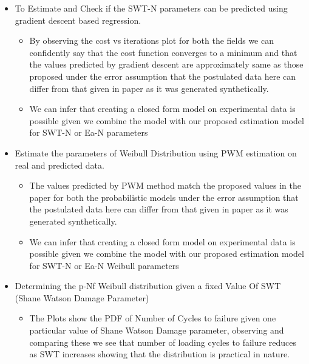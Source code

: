 \documentclass[11pt]{article}
\providecommand{\tightlist}{%
      \setlength{\itemsep}{0pt}\setlength{\parskip}{0pt}}
\begin{document}
\begin{itemize}
\item
  To Estimate and Check if the SWT-N parameters can be predicted using
  gradient descent based regression.

  \begin{itemize}
  \tightlist
  \item
    By observing the cost vs iterations plot for both the fields we can
    confidently say that the cost function converges to a minimum and
    that the values predicted by gradient descent are approximately same
    as those proposed under the error assumption that the postulated
    data here can differ from that given in paper as it was generated
    synthetically.
  \item
    We can infer that creating a closed form model on experimental data
    is possible given we combine the model with our proposed estimation
    model for SWT-N or Ea-N parameters
  \end{itemize}
\item
  Estimate the parameters of Weibull Distribution using PWM estimation
  on real and predicted data.

  \begin{itemize}
  \tightlist
  \item
    The values predicted by PWM method match the proposed values in the
    paper for both the probabilistic models under the error assumption
    that the postulated data here can differ from that given in paper as
    it was generated synthetically.
  \item
    We can infer that creating a closed form model on experimental data
    is possible given we combine the model with our proposed estimation
    model for SWT-N or Ea-N Weibull parameters
  \end{itemize}
\item
  Determining the p-Nf Weibull distribution given a fixed Value Of SWT
  (Shane Watson Damage Parameter)

  \begin{itemize}
  \tightlist
  \item
    The Plots show the PDF of Number of Cycles to failure given one
    particular value of Shane Watson Damage parameter, observing and
    comparing these we see that number of loading cycles to failure
    reduces as SWT increases showing that the distribution is practical
    in nature.
  \end{itemize}
\end{itemize}
\end{document}
